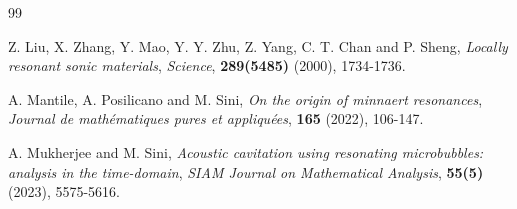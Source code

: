 \documentclass[11pt,reqno,twoside]{amsart}
\theoremstyle{definition}
\theoremstyle{remark}
\numberwithin{equation}{section}
\begin{document}
\begin{thebibliography}{99}
	
	
	
	
	
	
	
	
	
	Z. Liu, X. Zhang, Y. Mao, Y. Y. Zhu, Z. Yang, C. T. Chan and P. Sheng, {\it Locally resonant sonic materials}, {\em Science}, {\bf 289(5485)} (2000), 1734-1736.
	
	
	
	A. Mantile, A. Posilicano and M. Sini, {\it On the origin of minnaert resonances}, {\em Journal de math\'{e}matiques pures et appliqu\'{e}es}, {\bf 165} (2022),  106-147.
	
	
	
	
	
	
	
	
	
	
	
	
	
	A. Mukherjee and M. Sini, {\it Acoustic cavitation using resonating microbubbles: analysis in the time-domain}, {\em SIAM Journal on Mathematical Analysis}, {\bf 55(5)} (2023), 5575-5616.
	

\end{thebibliography}
\end{document}

